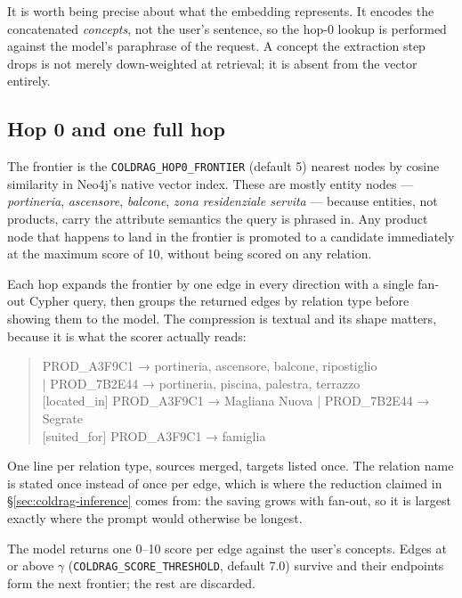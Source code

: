 It is worth being precise about what the embedding represents. It encodes the concatenated \emph{concepts}, not the user's sentence, so the hop-0 lookup is performed against the model's paraphrase of the request. A concept the extraction step drops is not merely down-weighted at retrieval; it is absent from the vector entirely.

\subsection{Hop 0 and one full hop}

The frontier is the \texttt{COLDRAG\_HOP0\_FRONTIER} (default 5) nearest nodes by cosine similarity in Neo4j's native vector index. These are mostly entity nodes --- \emph{portineria}, \emph{ascensore}, \emph{balcone}, \emph{zona residenziale servita} --- because entities, not products, carry the attribute semantics the query is phrased in. Any product node that happens to land in the frontier is promoted to a candidate immediately at the maximum score of 10, without being scored on any relation.

Each hop expands the frontier by one edge in every direction with a single fan-out Cypher query, then groups the returned edges by relation type before showing them to the model. The compression is textual and its shape matters, because it is what the scorer actually reads:

\begin{quote}\small{ PROD\_A3F9C1 → portineria, ascensore, balcone, ripostiglio\\
\phantom{[has\_attribute] }| PROD\_7B2E44 → portineria, piscina, palestra, terrazzo\\
{[located\_in]} PROD\_A3F9C1 → Magliana Nuova | PROD\_7B2E44 → Segrate\\
{[suited\_for]} PROD\_A3F9C1 → famiglia}
\end{quote}

One line per relation type, sources merged, targets listed once. The relation name is stated once instead of once per edge, which is where the reduction claimed in \S\ref{sec:coldrag-inference} comes from: the saving grows with fan-out, so it is largest exactly where the prompt would otherwise be longest.

The model returns one 0--10 score per edge against the user's concepts. Edges at or above $\gamma$ (\texttt{COLDRAG\_SCORE\_THRESHOLD}, default 7.0) survive and their endpoints form the next frontier; the rest are discarded.

